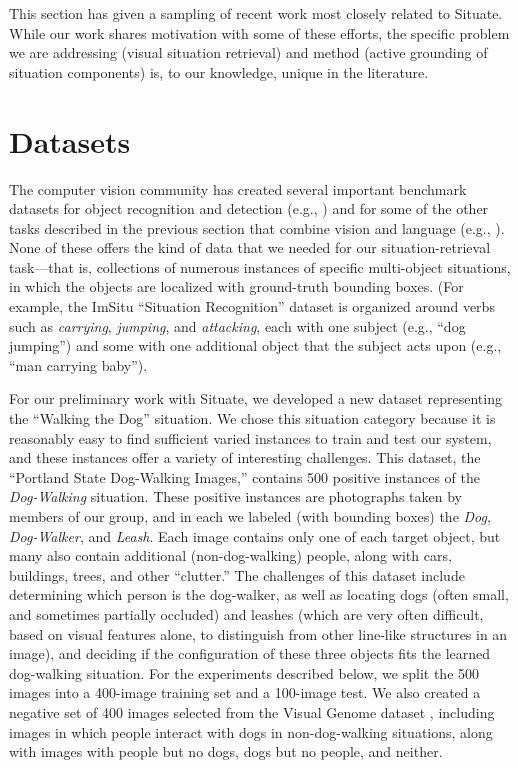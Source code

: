 \documentclass[conference]{IEEEtran}
\begin{document}
This section has given a sampling of recent work most closely related
to Situate.  While our work shares motivation with some of these
efforts, the specific problem we are addressing (visual situation
retrieval) and method (active grounding of situation components) is,
to our knowledge, unique in the literature.

\section{Datasets \label{Dataset}}

The computer vision community has created several important benchmark
datasets for object recognition and detection (e.g.,
\cite{Everingham2010,Socher2009}) and for some of the other tasks
described in the previous section that combine vision and language
(e.g., \cite{Krishna2017,Lin2014}).  None of these offers
the kind of data that we needed for our situation-retrieval
task---that is, collections of numerous instances of specific
multi-object situations, in which the objects are localized with
ground-truth bounding boxes. (For example, the ImSitu ``Situation
Recognition'' dataset is organized around verbs such as {\it
  carrying}, {\it jumping}, and {\it attacking}, each with one subject
(e.g., ``dog jumping'') and some with one additional object that the
subject acts upon (e.g., ``man carrying baby'').

For our preliminary work with Situate, we developed a new dataset
representing the ``Walking the Dog'' situation.  We chose this
situation category because it is reasonably easy to find sufficient
varied instances to train and test our system, and these instances
offer a variety of interesting challenges.  This dataset, the
``Portland State Dog-Walking Images,'' contains 500 positive instances
of the {\it Dog-Walking} situation.  These positive instances are
photographs taken by members of our group, and in each we labeled
(with bounding boxes) the {\it Dog}, {\it Dog-Walker}, and {\it
  Leash}.  Each image contains only one of each target object, but
many also contain additional (non-dog-walking) people, along with
cars, buildings, trees, and other ``clutter.''  The challenges of this
dataset include determining which person is the dog-walker, as well as
locating dogs (often small, and sometimes partially occluded) and
leashes (which are very often difficult, based on visual features
alone, to distinguish from other line-like structures in an image),
and deciding if the configuration of these three objects fits the
learned dog-walking situation.  For the experiments described below,
we split the 500 images into a 400-image training set and a 100-image
test.   We also created a negative set of 400 images selected from the Visual
Genome dataset \cite{Krishna2017}, including images in which people
interact with dogs in non-dog-walking situations, along with images
with people but no dogs, dogs but no people, and neither.  
\end{document}
